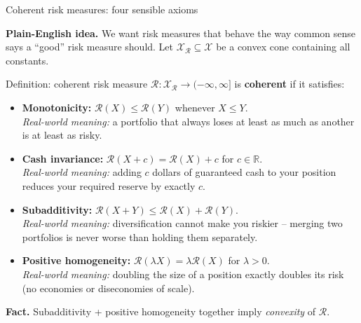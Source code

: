 \documentclass[aspectratio=169,10pt]{beamer}
\newcommand{\RR}{\mathbb{R}}
\newcommand{\1}{\mathbb{1}}
\begin{document}
\begin{frame}{Coherent risk measures: four sensible axioms}

\textbf{Plain-English idea.} We want risk measures that behave the way common sense says a ``good'' risk measure should. Let $\mathcal X_{\mathcal R} \subseteq \mathcal X$ be a convex cone containing all constants.

\begin{block}{Definition: coherent risk measure}
$\mathcal R: \mathcal X_{\mathcal R} \to (-\infty,\infty]$ is \textbf{coherent} if it satisfies:
\begin{itemize}
\item[(i)] \textbf{Monotonicity:} $\mathcal R(X) \le \mathcal R(Y)$ whenever $X \le Y$. \\ \emph{Real-world meaning:} a portfolio that always loses at least as much as another is at least as risky.
\item[(ii)] \textbf{Cash invariance:} $\mathcal R(X+c) = \mathcal R(X)+c$ for $c \in \RR$. \\ \emph{Real-world meaning:} adding $c$ dollars of guaranteed cash to your position reduces your required reserve by exactly $c$.
\item[(iii)] \textbf{Subadditivity:} $\mathcal R(X+Y) \le \mathcal R(X)+\mathcal R(Y)$. \\ \emph{Real-world meaning:} diversification cannot make you riskier -- merging two portfolios is never worse than holding them separately.
\item[(iv)] \textbf{Positive homogeneity:} $\mathcal R(\lambda X) = \lambda \mathcal R(X)$ for $\lambda>0$. \\ \emph{Real-world meaning:} doubling the size of a position exactly doubles its risk (no economies or diseconomies of scale).
\end{itemize}
\end{block}

\textbf{Fact.} Subadditivity + positive homogeneity together imply \emph{convexity} of $\mathcal R$.

\end{frame}
\end{document}

